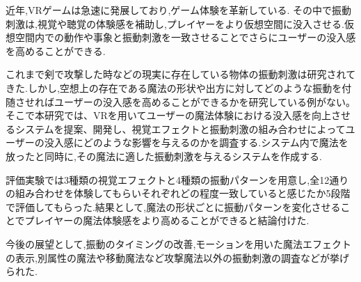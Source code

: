 近年,VRゲームは急速に発展しており,ゲーム体験を革新している.
その中で振動刺激は,視覚や聴覚の体験感を補助し,プレイヤーをより仮想空間に没入させる.仮想空間内での動作や事象と振動刺激を一致させることでさらにユーザーの没入感を高めることができる.

これまで剣で攻撃した時などの現実に存在している物体の振動刺激は研究されてきた.しかし,空想上の存在である魔法の形状や出方に対してどのような振動を付随させればユーザーの没入感を高めることができるかを研究している例がない。
そこで本研究では、VRを用いてユーザーの魔法体験における没入感を向上させるシステムを提案、開発し、視覚エフェクトと振動刺激の組み合わせによってユーザーの没入感にどのような影響を与えるのかを調査する.システム内で魔法を放ったと同時に,その魔法に適した振動刺激を与えるシステムを作成する.

評価実験では3種類の視覚エフェクトと4種類の振動パターンを用意し,全12通りの組み合わせを体験してもらいそれぞれどの程度一致していると感じたか5段階で評価してもらった.結果として,魔法の形状ごとに振動パターンを変化させることでプレイヤーの魔法体験感をより高めることができると結論付けた.

今後の展望として,振動のタイミングの改善,モーションを用いた魔法エフェクトの表示,別属性の魔法や移動魔法など攻撃魔法以外の振動刺激の調査などが挙げられた.
